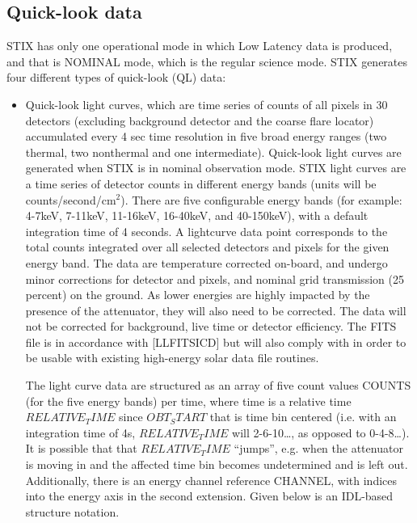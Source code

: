 \documentclass{aa}
\begin{document}
\subsection{Quick-look data}
STIX has only one operational mode in which Low Latency data is produced, and that is  NOMINAL mode, which is the regular science mode.
STIX generates four different types of quick-look (QL) data:
\begin{itemize}
                                                                                                                                                               \item Quick-look light curves, which are time series of counts
of all pixels in 30 detectors (excluding background detector and the coarse flare locator)
accumulated every 4 sec time resolution in five broad energy ranges (two thermal, two nonthermal
and one intermediate). Quick-look light curves are generated when STIX is in nominal observation mode.
STIX light curves are a time series of detector counts in different energy bands (units will be counts/second/cm$^2$). There are five configurable energy bands (for example: 4-7keV, 7-11keV, 11-16keV, 16-40keV, and 40-150keV), with a default integration time of 4 seconds. A lightcurve data point corresponds to the total counts integrated over all selected detectors and pixels for the given energy band. The data are temperature corrected on-board, and undergo minor corrections for detector and pixels,
and nominal grid transmission (25 percent) on the ground. As lower energies are highly impacted by the presence of the attenuator, they will also need to be corrected. The data will not be corrected for background, live time or detector efficiency. The FITS file is in accordance with [LLFITSICD] but will also comply with  in order to be usable with existing high-energy solar data file routines.

The light curve data are structured as an array of five count values COUNTS (for the five energy bands) per time, where time is a relative time $RELATIVE_TIME$ since $OBT_START$ that is time bin centered (i.e. with an integration time of 4s, $RELATIVE_TIME$ will 2-6-10…, as opposed to 0-4-8…). It is possible that that $RELATIVE_TIME$ “jumps”, e.g. when the attenuator is moving in and the affected time bin becomes undetermined and is left out. Additionally, there is an energy channel reference CHANNEL, with indices into the energy axis in the second extension. Given below is an IDL-based structure notation.


\end{itemize}
\end{document}
